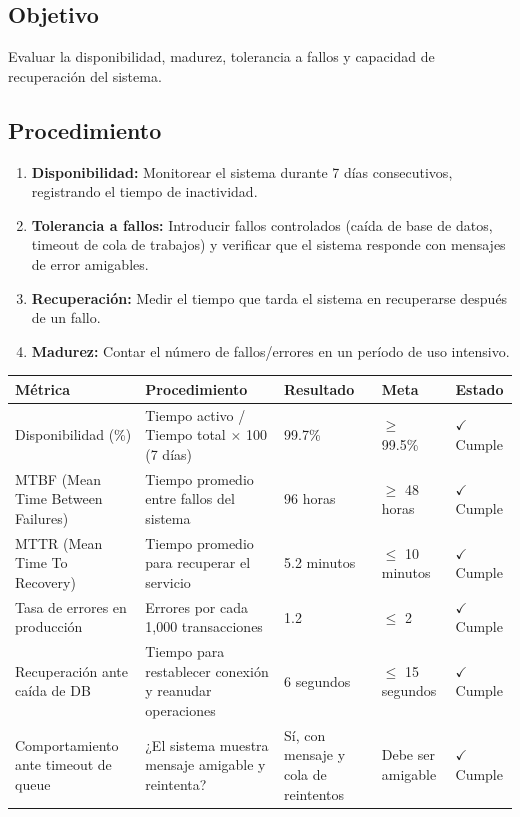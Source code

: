 \documentclass[stu]{apa7}
\begin{document}
\subsection{Objetivo}

Evaluar la disponibilidad, madurez, tolerancia a fallos y capacidad de recuperación del sistema.

\subsection{Procedimiento}

\begin{enumerate}
    \item \textbf{Disponibilidad:} Monitorear el sistema durante 7 días consecutivos, registrando el tiempo de inactividad.
    \item \textbf{Tolerancia a fallos:} Introducir fallos controlados (caída de base de datos, timeout de cola de trabajos) y verificar que el sistema responde con mensajes de error amigables.
    \item \textbf{Recuperación:} Medir el tiempo que tarda el sistema en recuperarse después de un fallo.
    \item \textbf{Madurez:} Contar el número de fallos/errores en un período de uso intensivo.
\end{enumerate}

\begin{longtable}{|L{4cm}|L{3.5cm}|C{2.5cm}|C{2cm}|C{1.5cm}|}
\hline
{}
\textbf{Métrica} & \textbf{Procedimiento} & \textbf{Resultado} & \textbf{Meta} & \textbf{Estado} \\
\hline
Disponibilidad (\%) & Tiempo activo / Tiempo total $\times$ 100 (7 días) & 99.7\% & $\geq$ 99.5\% & $\checkmark$ Cumple \\
\hline
MTBF (Mean Time Between Failures) & Tiempo promedio entre fallos del sistema & 96 horas & $\geq$ 48 horas & $\checkmark$ Cumple \\
\hline
MTTR (Mean Time To Recovery) & Tiempo promedio para recuperar el servicio & 5.2 minutos & $\leq$ 10 minutos & $\checkmark$ Cumple \\
\hline
Tasa de errores en producción & Errores por cada 1,000 transacciones & 1.2 & $\leq$ 2 & $\checkmark$ Cumple \\
\hline
Recuperación ante caída de DB & Tiempo para restablecer conexión y reanudar operaciones & 6 segundos & $\leq$ 15 segundos & $\checkmark$ Cumple \\
\hline
Comportamiento ante timeout de queue & ¿El sistema muestra mensaje amigable y reintenta? & Sí, con mensaje y cola de reintentos & Debe ser amigable & $\checkmark$ Cumple \\
\hline
\end{longtable}
\end{document}
